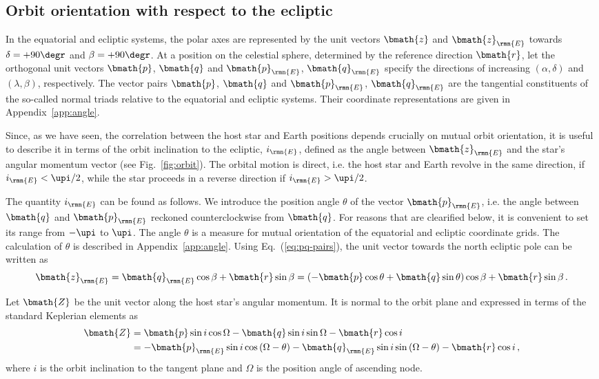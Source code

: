 \documentclass[fleqn,usenatbib,useAMS,usedcolumn]{mnras}
\begin{document}
\subsection{Orbit orientation with respect to the ecliptic}
\label{ss:orientation}

In the equatorial and ecliptic systems, the polar axes are represented by the unit vectors $\bmath{z}$ and $\bmath{z}_\rmn{E}$ towards $\delta=+90\degr$ and $\beta=+90\degr$. At a position on the celestial sphere, determined by the reference direction $\bmath{r}$, let the orthogonal unit vectors $\bmath{p}$, $\bmath{q}$ and $\bmath{p}_\rmn{E}$, $\bmath{q}_\rmn{E}$ specify the directions of increasing $\left(\alpha,\delta\right)$ and $\left(\lambda,\beta\right)$, respectively. The vector pairs  $\bmath{p}$, $\bmath{q}$ and $\bmath{p}_\rmn{E}$, $\bmath{q}_\rmn{E}$ are the tangential constituents of the so-called normal triads relative to the equatorial and ecliptic systems. Their coordinate representations are given in Appendix~\ref{app:angle}.

Since, as we have seen, the correlation between the host star and Earth positions depends crucially on mutual orbit orientation, it is useful to describe it in terms of the orbit inclination to the ecliptic, $i_\rmn{E}$, defined as the angle between $\bmath{z}_\rmn{E}$ and the star's angular momentum vector (see Fig.~\ref{fig:orbit}). The orbital motion is direct, i.e. the host star and Earth revolve in the same direction, if $i_\rmn{E}<\upi/2$, while the star proceeds in a reverse direction if $i_\rmn{E}>\upi/2$.

The quantity $i_\rmn{E}$ can be found as follows. We introduce the position angle $\theta$ of the vector $\bmath{p}_\rmn{E}$, i.e. the angle between $\bmath{q}$ and $\bmath{p}_\rmn{E}$ reckoned counterclockwise from $\bmath{q}$. For reasons that are clearified below, it is convenient to set its range from $-\upi$ to $\upi$. The angle $\theta$ is a measure for mutual orientation of the equatorial and ecliptic coordinate grids. The calculation of $\theta$ is described in Appendix~\ref{app:angle}. Using Eq.~(\ref{eq:pq-pairs}),
the unit vector towards the north ecliptic pole can be written as
\begin{equation}
    \bmath{z}_\rmn{E}=
    \bmath{q}_\rmn{E}\cos\beta+\bmath{r}\sin\beta=
    \left(-\bmath{p}\cos\theta+\bmath{q}\sin\theta\right)\cos\beta+\bmath{r}\sin\beta\,.
\end{equation}


Let $\bmath{Z}$ be the unit vector along the host star's angular momentum. It is normal to the orbit plane and expressed in terms of the standard Keplerian elements as
\begin{equation}
 \begin{aligned}
    \bmath{Z}
    &=
    \bmath{p}\sin i\cos\Omega-
    \bmath{q}\sin i\sin\Omega-
    \bmath{r}\cos i\\
    &=
    -\bmath{p}_\rmn{E}\sin i\cos\left(\Omega-\theta\right)
    -\bmath{q}_\rmn{E}\sin i\sin\left(\Omega-\theta\right)
    -\bmath{r}\cos i\,,
 \end{aligned}
\end{equation}
where $i$ is the orbit inclination to the tangent plane and $\Omega$ is the position angle of ascending node.
\end{document}
